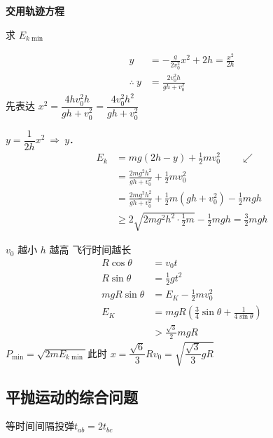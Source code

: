 \begin{problem}
\textbf{交用轨迹方程}


求 $E_{k\min}$
\begin{solution}
\begin{align*}
y&=-\frac{g}{2v_0^2}x^2+2h=\frac{x^2}{2h}\\
\therefore\ y&=\frac{2v_0^2h}{gh+v_0^2}
\end{align*}
先表达 $x^2=\dfrac{4hv_0^2h}{gh+v_0^2}=\dfrac{4v_0^2h^2}{gh+v_0^2}$

\quad $y=\dfrac{1}{2h}x^2\ \Rightarrow\ y$．
\begin{align*}
E_k&=mg(2h-y)+\frac{1}{2}mv_0^2\qquad\swarrow\\
&=\frac{2mg^2h^2}{gh+v_0^2}+\frac{1}{2}mv_0^2\\
&=\frac{2mg^2h^2}{gh+v_0^2}+\frac{1}{2}m(gh+v_0^2)-\frac{1}{2}mgh\\
&\ge2\sqrt{2mg^2h^2\cdot\frac{1}{2}m}-\frac{1}{2}mgh=\frac{3}{2}mgh
\end{align*}
\end{solution}
\end{problem}

\begin{problem}[1]

\begin{solution}
$v_0$ 越小 $h$ 越高 飞行时间越长
\begin{align*}
R\cos\theta&=v_0t\\
R\sin\theta&=\frac{1}{2}gt^2\\
mgR\sin\theta&=E_K-\frac{1}{2}mv_0^2\\
E_K&=mgR\left(\frac{3}{4}\sin\theta+\frac{1}{4\sin\theta}\right)\\
&>\frac{\sqrt{3}}{2}mgR %
\end{align*}
$P_{\min}=\sqrt{2mE_{k\min}}$\quad 此时 $x=\dfrac{\sqrt{6}}{3}R$\quad $v_0=\sqrt{\dfrac{\sqrt{3}}{3}gR}$
\end{solution}
\end{problem}

\subsection{平抛运动的综合问题}
\begin{minipage}[t]{0.47\linewidth}
\end{minipage}\hfill
\begin{minipage}[t]{0.50\linewidth}
等时间间隔投弹\quad $t_{ab}=2t_{bc}$
\end{minipage}

